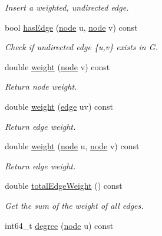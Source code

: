 \begin{DoxyCompactItemize}
\begin{DoxyCompactList}\small\item\em Insert a weighted, undirected edge. \end{DoxyCompactList}\item 
bool \hyperlink{class_ensemble_clustering_1_1_graph_a9be0c0a70204723e4b040b9cba51b15d}{has\-Edge} (\hyperlink{namespace_ensemble_clustering_ae829290aeccd1a420b17a37fd901f114}{node} u, \hyperlink{namespace_ensemble_clustering_ae829290aeccd1a420b17a37fd901f114}{node} v) const 
\begin{DoxyCompactList}\small\item\em Check if undirected edge \{u,v\} exists in G. \end{DoxyCompactList}\item 
double \hyperlink{class_ensemble_clustering_1_1_graph_a9bff231567f9ac604f1854d62f6682d1}{weight} (\hyperlink{namespace_ensemble_clustering_ae829290aeccd1a420b17a37fd901f114}{node} v) const 
\begin{DoxyCompactList}\small\item\em Return node weight. \end{DoxyCompactList}\item 
double \hyperlink{class_ensemble_clustering_1_1_graph_a656f5cb3119dd3f8f4182d38cce82fa0}{weight} (\hyperlink{namespace_ensemble_clustering_aff19dd5e3051ee3d4360fd3f29daf16b}{edge} uv) const 
\begin{DoxyCompactList}\small\item\em Return edge weight. \end{DoxyCompactList}\item 
double \hyperlink{class_ensemble_clustering_1_1_graph_a4699131f4d3602ecda00eaf70a86cbea}{weight} (\hyperlink{namespace_ensemble_clustering_ae829290aeccd1a420b17a37fd901f114}{node} u, \hyperlink{namespace_ensemble_clustering_ae829290aeccd1a420b17a37fd901f114}{node} v) const 
\begin{DoxyCompactList}\small\item\em Return edge weight. \end{DoxyCompactList}\item 
double \hyperlink{class_ensemble_clustering_1_1_graph_a7be7f13f5a31b0513293e7bbac26ca6c}{total\-Edge\-Weight} () const 
\begin{DoxyCompactList}\small\item\em Get the sum of the weight of all edges. \end{DoxyCompactList}\item 
int64\-\_\-t \hyperlink{class_ensemble_clustering_1_1_graph_a35f4b169cd0157117b468b1863a0d70a}{degree} (\hyperlink{namespace_ensemble_clustering_ae829290aeccd1a420b17a37fd901f114}{node} u) const 

\end{DoxyCompactItemize}
